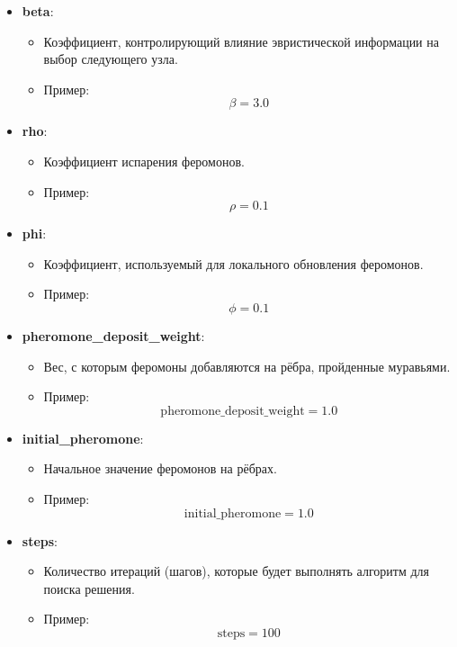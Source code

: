 \documentclass[14pt]{article}
\begin{document}
\begin{itemize}
    \item \textbf{beta}:
    \begin{itemize}
        \item Коэффициент, контролирующий влияние эвристической информации на выбор следующего узла.
        \item Пример: 
        \[
        \beta = 3.0
        \]
    \end{itemize}
    
    \item \textbf{rho}:
    \begin{itemize}
        \item Коэффициент испарения феромонов.
        \item Пример: 
        \[
        \rho = 0.1
        \]
    \end{itemize}
    
    \item \textbf{phi}:
    \begin{itemize}
        \item Коэффициент, используемый для локального обновления феромонов.
        \item Пример: 
        \[
        \phi = 0.1
        \]
    \end{itemize}
    
    \item \textbf{pheromone\_deposit\_weight}:
    \begin{itemize}
        \item Вес, с которым феромоны добавляются на рёбра, пройденные муравьями.
        \item Пример: 
        \[
        \text{pheromone\_deposit\_weight} = 1.0
        \]
    \end{itemize}
    
    \item \textbf{initial\_pheromone}:
    \begin{itemize}
    \item Начальное значение феромонов на рёбрах.
        \item Пример: 
        \[
        \text{initial\_pheromone} = 1.0
        \]
    \end{itemize}
    
    \item \textbf{steps}:
    \begin{itemize}
        \item Количество итераций (шагов), которые будет выполнять алгоритм для поиска решения.
        \item Пример: 
        \[
        \text{steps} = 100
        \]
    \end{itemize}
\end{itemize}
\end{document}
